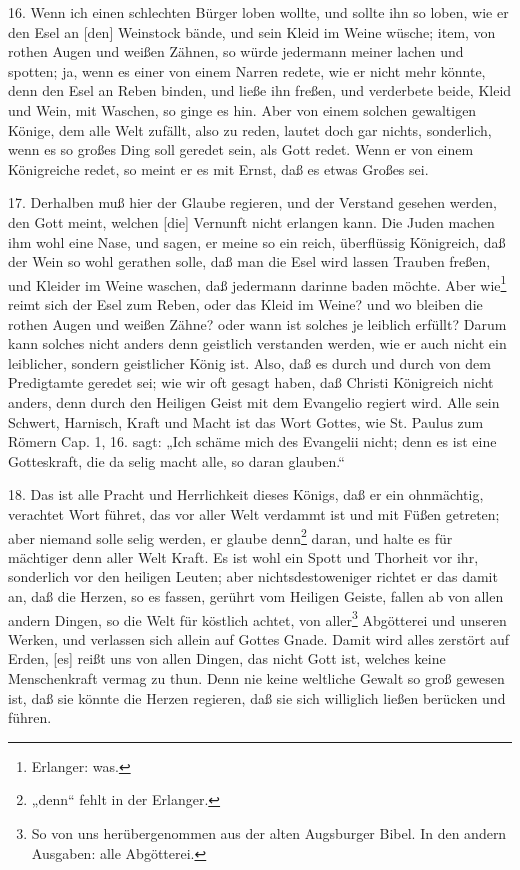 16. Wenn ich einen schlechten Bürger loben wollte, und sollte ihn so loben, wie er den Esel an [den] Weinstock bände, und sein Kleid im Weine wüsche; item, von rothen Augen und weißen Zähnen, so würde jedermann meiner lachen und spotten; ja, wenn es einer von einem Narren redete, wie er nicht mehr könnte, denn den Esel an Reben binden, und ließe ihn freßen, und verderbete beide, Kleid und Wein, mit Waschen, so ginge es hin. Aber von einem solchen gewaltigen Könige, dem alle Welt zufällt, also zu reden, lautet doch gar nichts, sonderlich, wenn es so großes Ding soll geredet sein, als Gott redet. Wenn er von einem Königreiche redet, so meint er es mit Ernst, daß es etwas Großes sei.

17. Derhalben muß hier der Glaube regieren, und der Verstand gesehen werden, den Gott meint, welchen [die] Vernunft nicht erlangen kann. Die Juden machen ihm wohl eine Nase, und sagen, er meine so ein reich, überflüssig Königreich, daß der Wein so wohl gerathen solle, daß man die Esel wird lassen Trauben freßen, und Kleider im Weine waschen, daß jedermann darinne baden möchte. Aber wie\footnote{Erlanger: was.} reimt sich der Esel zum Reben, oder das Kleid im Weine? und wo bleiben die rothen Augen und weißen Zähne? oder wann ist solches je leiblich erfüllt? Darum kann solches nicht anders denn geistlich verstanden werden, wie er auch nicht ein leiblicher, sondern geistlicher König ist. Also, daß es durch und durch von dem Predigtamte geredet sei; wie wir oft gesagt haben, daß Christi Königreich nicht anders, denn durch den Heiligen Geist mit dem Evangelio regiert wird. Alle sein Schwert, Harnisch, Kraft und Macht ist das Wort Gottes, wie St. Paulus zum Römern Cap. 1, 16. sagt: „Ich schäme mich des Evangelii nicht; denn es ist eine Gotteskraft, die da selig macht alle, so daran glauben.“

18. Das ist alle Pracht und Herrlichkeit dieses Königs, daß er ein ohnmächtig, verachtet Wort führet, das vor aller Welt verdammt ist und mit Füßen getreten; aber niemand solle selig werden, er glaube denn\footnote{„denn“ fehlt in der Erlanger.} daran, und halte es für
mächtiger denn aller Welt Kraft. Es ist wohl ein Spott und Thorheit vor ihr, sonderlich vor den heiligen Leuten; aber nichtsdestoweniger richtet er das damit an, daß die Herzen, so es fassen, gerührt vom Heiligen Geiste, fallen ab von allen andern Dingen, so die Welt für köstlich achtet, von aller\footnote{So von uns herübergenommen aus der alten Augsburger Bibel. In den andern Ausgaben: alle Abgötterei.} Abgötterei und unseren Werken, und verlassen sich allein auf Gottes Gnade. Damit wird alles zerstört auf Erden, [es] reißt uns von allen Dingen, das nicht Gott ist, welches keine Menschenkraft vermag zu thun. Denn nie keine weltliche Gewalt so groß gewesen ist, daß sie könnte die Herzen regieren, daß sie sich williglich ließen berücken und führen.

